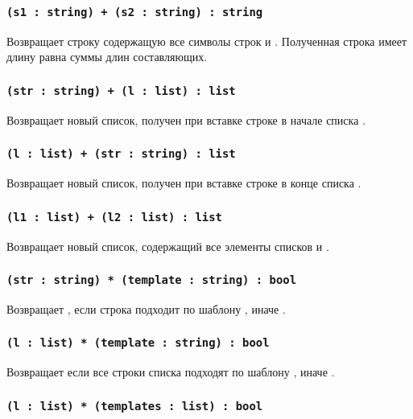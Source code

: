 \subsubsection{\lstinline`(s1 : string) + (s2 : string) : string`}

Возвращает строку содержащую все символы строк  и . Полученная строка имеет длину равна суммы длин составляющих.

\subsubsection{\lstinline`(str : string) + (l : list) : list`}

Возвращает новый список, получен при вставке строке  в начале списка .

\subsubsection{\lstinline`(l : list) + (str : string) : list`}

Возвращает новый список, получен при вставке строке  в конце списка .

\subsubsection{\lstinline`(l1 : list) + (l2 : list) : list`}

Возвращает новый список, содержащий все элементы списков  и .

\subsubsection{\lstinline`(str : string) * (template : string) : bool`}

Возвращает \true{}, если строка  подходит по шаблону , иначе \false{}.

\subsubsection{\lstinline`(l : list) * (template : string) : bool`}

Возвращает \true{} если все строки списка  подходят по шаблону , иначе \false{}.

\subsubsection{\lstinline`(l : list) * (templates : list) : bool`}

